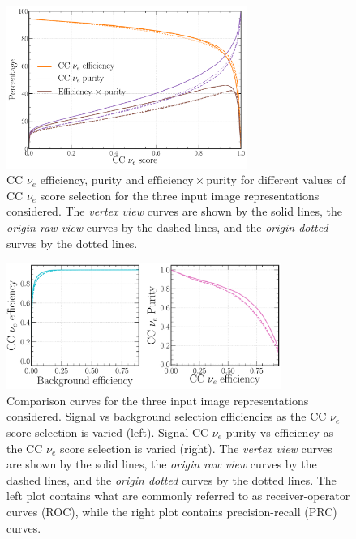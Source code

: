 \begin{figure} %
    \includegraphics[width=0.7\textwidth]{diagrams/6-cvn/chipsnet/repr_nuel_eff_curves.pdf}
    \caption[CC $\nu_{e}$ efficiency and purity curves for the three input image representations.]
    {CC $\nu_{e}$ efficiency, purity and $\mathrm{efficiency}\times\mathrm{purity}$ for different
        values of CC $\nu_{e}$ score selection for the three input image representations
        considered. The \emph{vertex view} curves are shown by the solid lines, the \emph{origin
            raw view} curves by the dashed lines, and the \emph{origin dotted} surves by the dotted
        lines.}
    \label{fig:repr_nuel_eff_curves}
\end{figure}

\begin{figure} %
    \includegraphics[width=0.8\textwidth]{diagrams/6-cvn/chipsnet/repr_nuel_comp_curves.pdf}
    \caption[Comparison curves for the three input image representations considered.]
    {Comparison curves for the three input image representations considered. Signal vs background
        selection efficiencies as the CC $\nu_{e}$ score selection is varied (left). Signal CC
        $\nu_{e}$ purity vs efficiency as the CC $\nu_{e}$ score selection is varied (right). The
        \emph{vertex view} curves are shown by the solid lines, the \emph{origin raw view} curves
        by the dashed lines, and the \emph{origin dotted} curves by the dotted lines. The left
        plot contains what are commonly referred to as receiver-operator curves (ROC), while the
        right plot contains precision-recall (PRC) curves.}
    \label{fig:repr_nuel_comp_curves}
\end{figure}

